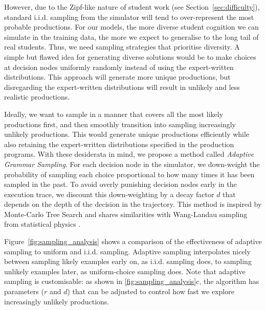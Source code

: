 However, due to the Zipf-like nature of student work (see Section~\ref{sec:difficulty}), standard i.i.d. sampling from the simulator will tend to over-represent the most probable productions.
For our models, the more diverse student cognition we can simulate in the training data, the more we expect to generalise to the long tail of real students. Thus, we need sampling strategies that prioritise diversity.
A simple but flawed idea for generating diverse solutions would be to make choices at decision nodes uniformly randomly instead of using the expert-written distributions. This approach will generate more unique productions, but disregarding the expert-written distributions will result in unlikely and less realistic productions.

Ideally, we want to sample in a manner that covers all the most likely productions first, and then smoothly transition into sampling increasingly unlikely productions. This would generate unique productions efficiently while also retaining the expert-written distributions specified in the production programs. 
With these desiderata in mind, we propose a method called \textit{Adaptive Grammar Sampling}. For each decision node in the simulator, we down-weight the probability of sampling each choice proportional to how many times it has been sampled in the past. To avoid overly punishing decision nodes early in the execution trace, we discount this down-weighting by a decay factor $d$ that depends on the depth of the decision in the trajectory. This method is inspired by Monte-Carlo Tree Search \cite{mcts_chang} and shares similarities with Wang-Landau sampling from statistical physics \cite{wang_landau}. 

Figure~\ref{fig:sampling_analysis} shows a comparison of the effectiveness of adaptive sampling to uniform and i.i.d. sampling. 
Adaptive sampling interpolates nicely between sampling likely examples early on, as i.i.d. sampling does, to sampling unlikely examples later, as uniform-choice sampling does.
Note that adaptive sampling is customisable: as shown in \ref{fig:sampling_analysis}c, the algorithm has parameters ($r$ and $d$) that can be adjusted to control how fast we explore increasingly unlikely productions.

